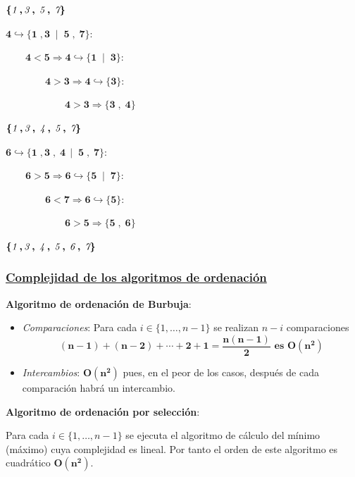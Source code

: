 \documentclass[twoside]{report}
\newcommand{\bs}[1]{\boldsymbol{#1}}
\begin{document}
        $\bs{\{\emph{1}\;,\emph{3}\;,\;\emph{5}\;,\;\emph{7}\}}$
        \medskip

        $\bs{4\hookrightarrow\{1\;,3\;\mid\;5\;,\;7\}:}$\par
            $\bs{\qquad4<5\Rightarrow4\hookrightarrow\{1\;\mid\;3\}:}$\par
                $\bs{\qquad\qquad4>3\Rightarrow4\hookrightarrow\{3\}:}$\par
                    $\bs{\qquad\qquad\qquad4>3\Rightarrow\{3\;,\;4\}}$
        \medskip

        $\bs{\{\emph{1}\;,\emph{3}\;,\;\emph{4}\;,\;\emph{5}\;,\;\emph{7}\}}$
        \medskip

        $\bs{6\hookrightarrow\{1\;,3\;,\;4\,\mid\;5\;,\;7\}:}$\par
            $\bs{\qquad6>5\Rightarrow6\hookrightarrow\{5\;\mid\;7\}:}$\par
                $\bs{\qquad\qquad6<7\Rightarrow6\hookrightarrow\{5\}:}$\par
                    $\bs{\qquad\qquad\qquad6>5\Rightarrow\{5\;,\;6\}}$
        \medskip

        $\bs{\{\emph{1}\;,\emph{3}\;,\;\emph{4}\;,\;\emph{5}\;,\;\emph{6}\;,\;\emph{7}\}}$




\subsubsection{\underline{Complejidad de los algoritmos de ordenación}}
\vspace{0.4cm}

\noindent\textbf{Algoritmo de ordenación de Burbuja}:

 \begin{itemize}
    \item \emph{Comparaciones}: Para cada $i\in \{1,\ldots, n-1\}$ se realizan $n-i$ comparaciones
    $$\bs{(n-1)+(n-2)+\cdots+2+1=\frac{n(n-1)}{2} \mbox{ es } O(n^2)}$$

    \item \emph{Intercambios}: $\bs{O(n^2)}$ pues, en el peor de los casos, después de cada comparación habrá un intercambio.
 \end{itemize}
\vspace{0.4cm}

 \noindent\textbf{Algoritmo de ordenación por selección}:

\vspace{0.4cm}
Para cada $i\in \{1,\ldots, n-1\}$ se ejecuta el algoritmo de
cálculo del mínimo (máximo) cuya complejidad es lineal. Por tanto
el orden de este algoritmo es cuadrático $\bs{O(n^2)}.$
\vspace{1.5cm}
\end{document}
